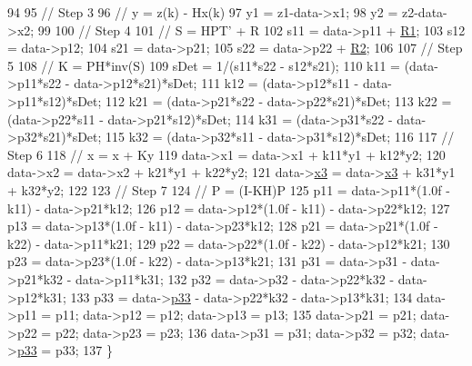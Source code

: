 \begin{DoxyCode}
94 
95     \textcolor{comment}{// Step 3}
96     \textcolor{comment}{// y = z(k) - Hx(k)}
97     y1 = z1-data->x1;
98     y2 = z2-data->x2;
99 
100     \textcolor{comment}{// Step 4}
101     \textcolor{comment}{// S = HPT' + R}
102     s11 = data->p11 + \hyperlink{group__config_ga918f64eb53db8e8dc694f36a87646476}{R1};
103     s12 = data->p12;
104     s21 = data->p21;
105     s22 = data->p22 + \hyperlink{group__config_ga7a255a2815b9453060f51c6eb22cfed8}{R2};
106 
107     \textcolor{comment}{// Step 5}
108     \textcolor{comment}{// K = PH*inv(S)}
109     sDet = 1/(s11*s22 - s12*s21);
110     k11 = (data->p11*s22 - data->p12*s21)*sDet;
111     k12 = (data->p12*s11 - data->p11*s12)*sDet;
112     k21 = (data->p21*s22 - data->p22*s21)*sDet;
113     k22 = (data->p22*s11 - data->p21*s12)*sDet;
114     k31 = (data->p31*s22 - data->p32*s21)*sDet;
115     k32 = (data->p32*s11 - data->p31*s12)*sDet;
116 
117     \textcolor{comment}{// Step 6}
118     \textcolor{comment}{// x = x + Ky}
119     data->x1 = data->x1 + k11*y1 + k12*y2;
120     data->x2 = data->x2 + k21*y1 + k22*y2;
121     data->\hyperlink{struct_kalman_a98e99f64ddf7321e4eae52beca4b580f}{x3} = data->\hyperlink{struct_kalman_a98e99f64ddf7321e4eae52beca4b580f}{x3} + k31*y1 + k32*y2;
122 
123     \textcolor{comment}{// Step 7}
124     \textcolor{comment}{// P = (I-KH)P}
125     p11 = data->p11*(1.0f - k11) - data->p21*k12;
126     p12 = data->p12*(1.0f - k11) - data->p22*k12;
127     p13 = data->p13*(1.0f - k11) - data->p23*k12;
128     p21 = data->p21*(1.0f - k22) - data->p11*k21;
129     p22 = data->p22*(1.0f - k22) - data->p12*k21;
130     p23 = data->p23*(1.0f - k22) - data->p13*k21;
131     p31 = data->p31 - data->p21*k32 - data->p11*k31;
132     p32 = data->p32 - data->p22*k32 - data->p12*k31;
133     p33 = data->\hyperlink{struct_kalman_a30801bc9a38fd4c527388e0725fa62f8}{p33} - data->p22*k32 - data->p13*k31;
134     data->p11 = p11; data->p12 = p12; data->p13 = p13;
135     data->p21 = p21; data->p22 = p22; data->p23 = p23;
136     data->p31 = p31; data->p32 = p32; data->\hyperlink{struct_kalman_a30801bc9a38fd4c527388e0725fa62f8}{p33} = p33;
137 \}
\end{DoxyCode}
